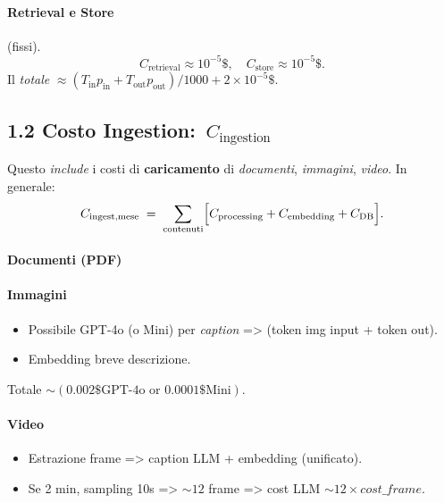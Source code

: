 \documentclass[a4paper,10pt]{article}
\begin{document}
\paragraph{Retrieval e Store} (fissi).
\[
C_{\text{retrieval}}\approx 10^{-5}\$,\quad
C_{\text{store}}\approx 10^{-5}\$.
\]
Il \emph{totale} \(\approx (T_{\text{in}}p_{\text{in}}+T_{\text{out}}p_{\text{out}})/1000 + 2\times10^{-5}\$.\)

\subsection*{1.2 Costo Ingestion: \(\,C_{\text{ingestion}}\)}

Questo \emph{include} i costi di \textbf{caricamento} di \emph{documenti}, \emph{immagini}, \emph{video}. In generale:
\[
C_{\text{ingest,mese}}
\;=\;
\sum_{\text{contenuti}} \Bigl[C_{\text{processing}} + C_{\text{embedding}} + C_{\text{DB}}\Bigr].
\]

\paragraph{Documenti (PDF)}

\paragraph{Immagini}
\begin{itemize}
    \item Possibile GPT-4o (o Mini) per \emph{caption} => (token img input + token out).
    \item Embedding breve descrizione.
\end{itemize}
Totale \(\sim (0.002\$ \text{GPT-4o} \text{ or } 0.0001\$ \text{Mini})\).

\paragraph{Video}
\begin{itemize}
    \item Estrazione frame => caption LLM + embedding (unificato).
    \item Se 2 min, sampling 10s => \(\sim12\) frame => cost LLM \(\sim12 \times cost\_frame\).
\end{itemize}
\end{document}
